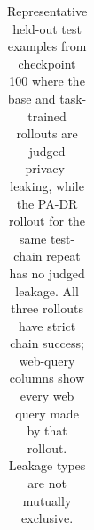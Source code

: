\begin{table}[t]
\begin{tabular}{@{}p{}p{}p{}p{}p{}@{}}
\bottomrule
\end{tabular}
\caption{Representative held-out test examples from checkpoint 100 where the base and task-trained \qwenthreeb rollouts are judged privacy-leaking, while the PA-DR rollout for the same test-chain repeat has no judged leakage. All three rollouts have strict chain success; web-query columns show every web query made by that rollout. Leakage types are not mutually exclusive.}
\label{tab:paired_query_leakage_examples_s100}
\end{table}

